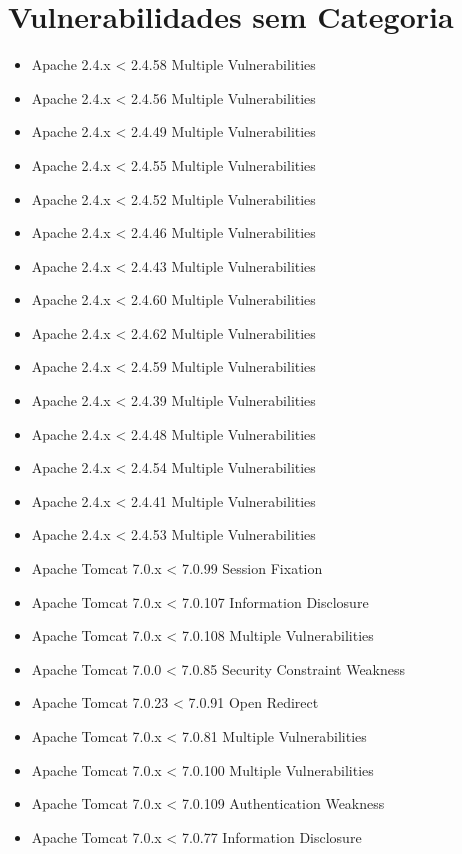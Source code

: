 \documentclass[a4paper,12pt]{article}
\begin{document}
\section{Vulnerabilidades sem Categoria}
\begin{itemize}
    \item Apache 2.4.x < 2.4.58 Multiple Vulnerabilities
    \item Apache 2.4.x < 2.4.56 Multiple Vulnerabilities
    \item Apache 2.4.x < 2.4.49 Multiple Vulnerabilities
    \item Apache 2.4.x < 2.4.55 Multiple Vulnerabilities
    \item Apache 2.4.x < 2.4.52 Multiple Vulnerabilities
    \item Apache 2.4.x < 2.4.46 Multiple Vulnerabilities
    \item Apache 2.4.x < 2.4.43 Multiple Vulnerabilities
    \item Apache 2.4.x < 2.4.60 Multiple Vulnerabilities
    \item Apache 2.4.x < 2.4.62 Multiple Vulnerabilities
    \item Apache 2.4.x < 2.4.59 Multiple Vulnerabilities
    \item Apache 2.4.x < 2.4.39 Multiple Vulnerabilities
    \item Apache 2.4.x < 2.4.48 Multiple Vulnerabilities
    \item Apache 2.4.x < 2.4.54 Multiple Vulnerabilities
    \item Apache 2.4.x < 2.4.41 Multiple Vulnerabilities
    \item Apache 2.4.x < 2.4.53 Multiple Vulnerabilities
    \item Apache Tomcat 7.0.x < 7.0.99 Session Fixation
    \item Apache Tomcat 7.0.x < 7.0.107 Information Disclosure
    \item Apache Tomcat 7.0.x < 7.0.108 Multiple Vulnerabilities
    \item Apache Tomcat 7.0.0 < 7.0.85 Security Constraint Weakness
    \item Apache Tomcat 7.0.23 < 7.0.91 Open Redirect
    \item Apache Tomcat 7.0.x < 7.0.81 Multiple Vulnerabilities
    \item Apache Tomcat 7.0.x < 7.0.100 Multiple Vulnerabilities
    \item Apache Tomcat 7.0.x < 7.0.109 Authentication Weakness
    \item Apache Tomcat 7.0.x < 7.0.77 Information Disclosure

\end{itemize}
\end{document}
